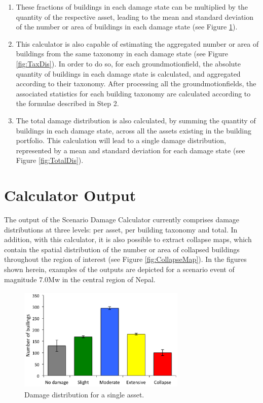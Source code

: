 \begin{enumerate}
Where $m$ stands for the number of \glspl{groundmotionfield} simulated. 

\item These fractions of buildings in each damage state can be multiplied by the quantity of the respective asset, leading to the mean and standard deviation of the number or area of buildings in each damage state (see Figure \ref{fig:AssetDis}). 

\item This calculator is also capable of estimating the aggregated number or area of buildings from the same \gls{taxonomy} in each damage state (see Figure \ref{fig:TaxDis}). In order to do so, for each \gls{groundmotionfield}, the absolute quantity of buildings in each damage state is calculated, and aggregated according to their \gls{taxonomy}. After processing all the \glspl{groundmotionfield}, the associated statistics for each building \gls{taxonomy} are calculated according to the formulae described in Step 2.

\item The total damage distribution is also calculated, by summing the quantity of buildings in each damage state, across all the \glspl{asset} existing in the building portfolio. This calculation will lead to a single damage distribution, represented by a mean and standard deviation for each damage state (see Figure \ref{fig:TotalDis}).

\end{enumerate}

\section{Calculator Output}
The output of the Scenario Damage Calculator currently comprises damage distributions at three levels: per \gls{asset}, per building \gls{taxonomy} and total. In addition, with this calculator, it is also possible to extract collapse maps, which contain the spatial distribution of the number or area of collapsed buildings throughout the region of interest (see Figure \ref{fig:CollapseMap}). In the figures shown herein, examples of the outputs are depicted for a scenario event of magnitude 7.0Mw in the central region of Nepal.

\begin{figure}[ht]
\centering
\includegraphics[width=8cm,height=5cm]{./figures/risk/AssetDisaggregation.eps}
\caption{Damage distribution for a single asset.}
\label{fig:AssetDis}
\end{figure} 

